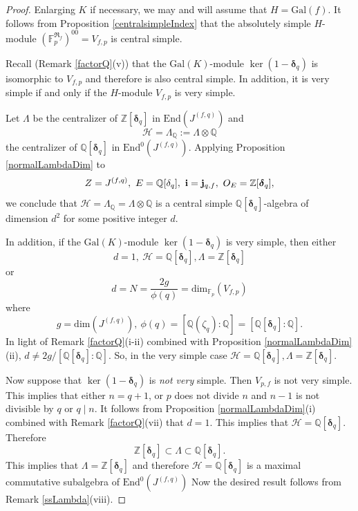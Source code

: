 \documentclass[12pt,a4paper,reqno]{amsart}
\def\Q{{\mathbb Q}}
\def\Z{{\mathbb Z}}
\def\R{{\mathbb R}}
\def\F{{\mathbb F}}
\def\R{{\mathfrak R}}
\def\Gal{\mathrm{Gal}}
\def\End{\mathrm{End}}
\def\dim{\mathrm{dim}}
\def\delt{{\boldsymbol \delta}}
\theoremstyle{definition}
\begin{document}
\begin{proof}
Enlarging $K$ if necessary, we may and will assume that $H=\Gal(f)$. It follows from Proposition \ref{centralsimpleIndex} that
the  absolutely simple $H$-module $(\F_p^{\R_f})^{00}=V_{f,p}$ is central simple. 

Recall (Remark \ref{factorQ}(v))  that  the $\Gal(K)$-module $\ker(1-\delt_q)$  is isomorphic to $V_{f,p}$ and therefore
is also central simple. In addition, it is very simple if and only if
the $H$-module $V_{f,p}$ is very simple.

Let $\Lambda$ be the centralizer of $\Z[\delt_q]$ in $\End(J^{(f,q)})$ and
$$\mathcal{H}=\Lambda_{\Q}:=\Lambda\otimes\Q$$
the centralizer of $\Q[\delt_q]$ in $\End^{0}(J^{(f,q)})$.
Applying Proposition \ref{normalLambdaDim} to 
$$Z=J^{(f,q)}, \ E=\Q[\delta_q], \  {\bf i}={\bf j}_{q,f}, \ O_E=\Z[\delt_q], $$
we conclude that $\mathcal{H}=\Lambda_{\Q}=\Lambda\otimes\Q$ is a central simple $\Q[\delt_q]$-algebra of dimension $d^2$ for some positive integer $d$.

In addition, if  the $\Gal(K)$-module $\ker(1-\delt_q)$ is  very simple, then either 
$$d=1, \ \mathcal{H}=\Q[\delt_q], \Lambda=\Z[\delt_q]$$
or 
$$d=N=\frac{2g}{\phi(q)}=\dim_{\F_p} (V_{f,p})$$ 
where 
$$g=\dim(J^{(f,q)}), \ \phi(q)=[\Q(\zeta_q):\Q]=[\Q[\delt_q]:\Q].$$
In light of   Remark \ref{factorQ}(i-ii) combined with Proposition \ref{normalLambdaDim}(ii), $ d \ne 2g/[\Q[\delt_q]:\Q]$. So, in the very simple case
$\mathcal{H}=\Q[\delt_q], \Lambda=\Z[\delt_q]$.

Now suppose that $\ker(1-\delt_q)$ is   {\sl not very} simple. Then $V_{p,f}$ is not very simple.
 This implies that either $n=q+1$,  or $p$ does not divide $n$ and $n-1$ is not divisible by $q$ or $q\mid n$. It follows from  %
 Proposition \ref{normalLambdaDim}(i)
combined with Remark \ref{factorQ}(vii)
that $d=1$. This implies that 
$\mathcal{H}=\Q[\delt_q]$.  Therefore 
$$\Z[\delt_q]\subset \Lambda \subset \Q[\delt_q].$$
This implies that $\Lambda=\Z[\delt_q]$ and therefore $\mathcal{H}=\Q[\delt_q]$ is a maximal commutative subalgebra of
$\End^0(J^{(f,q)})$
 Now the desired result follows from Remark \ref{ssLambda}(viii).
\end{proof}
\end{document}
